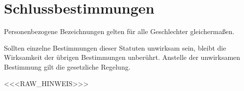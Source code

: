 \documentclass[a4paper,11pt]{article}
\begin{document}
\section{Schlussbestimmungen}\label{par:schluss}
\begin{absaetze}
  \item Personenbezogene Bezeichnungen gelten für alle Geschlechter gleichermaßen.
  \item Sollten einzelne Bestimmungen dieser Statuten unwirksam sein, bleibt die Wirksamkeit der übrigen Bestimmungen
        unberührt. Anstelle der unwirksamen Bestimmung gilt die gesetzliche Regelung.
\end{absaetze}

\vspace{8mm}
{\small\color{midgray}<<<RAW_HINWEIS>>>}
\end{document}
